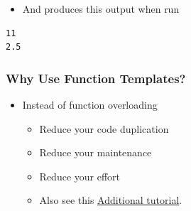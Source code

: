 \begin{Shaded}
\begin{Highlighting}[]
  

 \NormalTok{<} 
\NormalTok{\{}
   
\NormalTok{\}}

 
   \NormalTok{;}
   \NormalTok{;}
  \NormalTok{;}
  \NormalTok{;}
   \NormalTok{;}
\NormalTok{\}}
\end{Highlighting}
\end{Shaded}

\begin{itemize}
\itemsep1pt\parskip0pt
\item
  And produces this output when run
\end{itemize}

\begin{verbatim}
11
2.5
\end{verbatim}

\subsubsection{Why Use Function
Templates?}\label{why-use-function-templates}

\begin{itemize}
\itemsep1pt\parskip0pt
\item
  Instead of function overloading

  \begin{itemize}
  \itemsep1pt\parskip0pt
  \item
    Reduce your code duplication
  \item
    Reduce your maintenance
  \item
    Reduce your effort
  \item
    Also see this
    \href{http://www.codeproject.com/Articles/257589/An-Idiots-Guide-to-Cplusplus-Templates-Part}{Additional
    tutorial}.
  \end{itemize}
\end{itemize}

